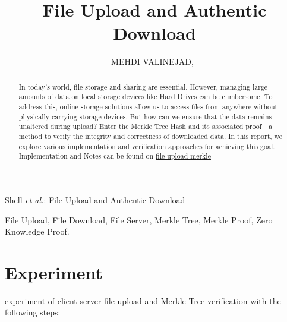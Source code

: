 \documentclass[journal]{IEEEtran}
\begin{document}
\title{File Upload and Authentic Download}
\author{MEHDI VALINEJAD,~}

%
{Shell \MakeLowercase{\textit{et al.}}: File Upload and Authentic Download}

\maketitle

\begin{abstract}
In today’s world, file storage and sharing are essential. However, managing large amounts of data on local storage devices 
like Hard Drives can be cumbersome. To address this, online storage solutions allow us to access files from anywhere without 
physically carrying storage devices. But how can we ensure that the data remains unaltered during upload? Enter 
the Merkle Tree Hash and its associated proof—a method to verify the integrity and correctness of downloaded data. 
In this report, we explore various implementation and verification approaches for achieving this goal.
Implementation and Notes can be found on \href{https://github.com/TxCorpi0x/file-upload-merkle}{file-upload-merkle}
\end{abstract}

\begin{IEEEkeywords}
File Upload, File Download, File Server, Merkle Tree, Merkle Proof, Zero Knowledge Proof.
\end{IEEEkeywords}

\IEEEpeerreviewmaketitle

\section{Experiment}

 experiment of client-server file upload and Merkle Tree verification with the following steps:
\end{document}
